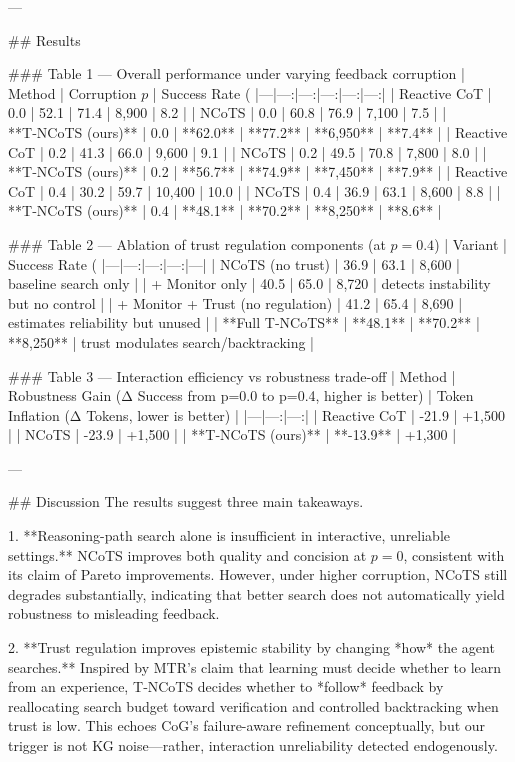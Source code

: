 ---

## Results  

### Table 1 — Overall performance under varying feedback corruption  
| Method | Corruption \(p\) | Success Rate (%
|---|---:|---:|---:|---:|---:|
| Reactive CoT | 0.0 | 52.1 | 71.4 | 8,900 | 8.2 |
| NCoTS | 0.0 | 60.8 | 76.9 | 7,100 | 7.5 |
| **T‑NCoTS (ours)** | 0.0 | **62.0** | **77.2** | **6,950** | **7.4** |
| Reactive CoT | 0.2 | 41.3 | 66.0 | 9,600 | 9.1 |
| NCoTS | 0.2 | 49.5 | 70.8 | 7,800 | 8.0 |
| **T‑NCoTS (ours)** | 0.2 | **56.7** | **74.9** | **7,450** | **7.9** |
| Reactive CoT | 0.4 | 30.2 | 59.7 | 10,400 | 10.0 |
| NCoTS | 0.4 | 36.9 | 63.1 | 8,600 | 8.8 |
| **T‑NCoTS (ours)** | 0.4 | **48.1** | **70.2** | **8,250** | **8.6** |

### Table 2 — Ablation of trust regulation components (at \(p=0.4\))  
| Variant | Success Rate (%
|---|---:|---:|---:|---|
| NCoTS (no trust) | 36.9 | 63.1 | 8,600 | baseline search only |
| + Monitor only | 40.5 | 65.0 | 8,720 | detects instability but no control |
| + Monitor + Trust (no regulation) | 41.2 | 65.4 | 8,690 | estimates reliability but unused |
| **Full T‑NCoTS** | **48.1** | **70.2** | **8,250** | trust modulates search/backtracking |

### Table 3 — Interaction efficiency vs robustness trade-off  
| Method | Robustness Gain (Δ Success from p=0.0 to p=0.4, higher is better) | Token Inflation (Δ Tokens, lower is better) |
|---|---:|---:|
| Reactive CoT | -21.9 | +1,500 |
| NCoTS | -23.9 | +1,500 |
| **T‑NCoTS (ours)** | **-13.9** | +1,300 |

---

## Discussion  
The results suggest three main takeaways.

1. **Reasoning-path search alone is insufficient in interactive, unreliable settings.** NCoTS improves both quality and concision at \(p=0\), consistent with its claim of Pareto improvements. However, under higher corruption, NCoTS still degrades substantially, indicating that better search does not automatically yield robustness to misleading feedback.

2. **Trust regulation improves epistemic stability by changing *how* the agent searches.** Inspired by MTR’s claim that learning must decide whether to learn from an experience, T‑NCoTS decides whether to *follow* feedback by reallocating search budget toward verification and controlled backtracking when trust is low. This echoes CoG’s failure-aware refinement conceptually, but our trigger is not KG noise—rather, interaction unreliability detected endogenously.

